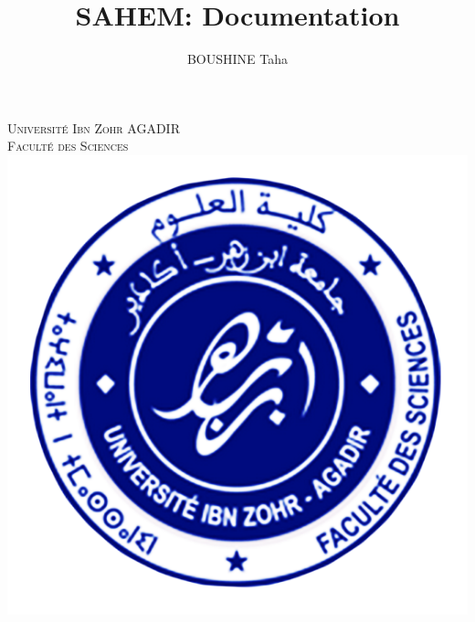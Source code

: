 \documentclass[11pt, openany]{report}
\begin{document}
\title{SAHEM: Documentation  }
\author{BOUSHINE Taha}
\date{}


\thispagestyle{empty}
\renewcommand{\chaptermark}[1]{\markboth{\chaptername\ \thechapter. #1}{}}
\renewcommand{\sectionmark}[1]{\markright{\thesection. #1}}


\makeatletter
\def\figurename{{\protect\sc \protect\small\bfseries Fig.}}
\let\captionORI\caption
\def\caption#1{\captionORI{\rm\small #1}}
\makeatother


\begin{titlepage}
  \begin{sffamily}
  \begin{center}

    \textsc{\LARGE Université Ibn Zohr AGADIR\\
        Faculté des Sciences\\[1cm]
        }
    \includegraphics[scale=0.35]{assets/fsa.png}~\\[1cm]



\end{center}
\end{sffamily}
\end{titlepage}
\end{document}
